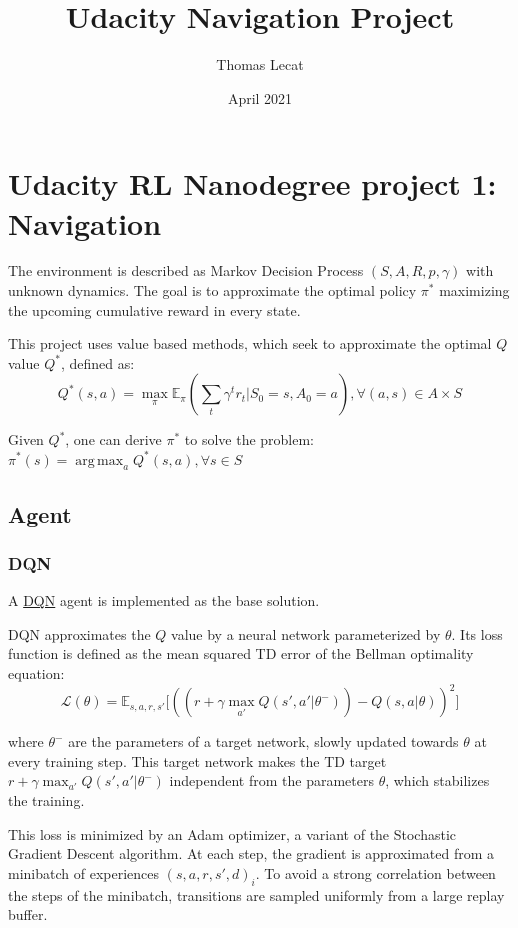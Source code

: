 \documentclass{article}
\title{Udacity Navigation Project}
\author{Thomas Lecat}
\date{April 2021}
\DeclareMathOperator*{\argmax}{arg\,max}
\begin{document}
    \maketitle


    \section{Udacity RL Nanodegree project 1: Navigation}

    The environment is described as Markov Decision Process $(S, A, R, p, \gamma)$ with
    unknown dynamics. The goal is to approximate the optimal policy $\pi^*$ maximizing
    the upcoming cumulative reward in every state.

    This project uses value based methods, which seek to approximate the optimal $Q$ value
    $Q^*$, defined as:
    \[
    Q^*(s, a) = \max_{\pi} \mathbb{E}_{\pi} (\sum_{t} \gamma^t r_t | S_0=s, A_0=a),  \forall (a, s) \in A \times S
    \]

    Given $Q^*$, one can derive $\pi^*$ to solve the problem:
    $\pi^*(s) = \argmax_a Q^*(s, a), \forall s \in S$

    \subsection{Agent}

    \subsubsection{DQN}


    A \href{https://storage.googleapis.com/deepmind-media/dqn/DQNNaturePaper.pdf}{DQN} agent
    is implemented as the base solution.

    DQN approximates the $Q$ value by a neural network parameterized by $\theta$.
    Its loss function is defined as the mean squared TD error of the Bellman optimality equation:
    \[
    \mathcal{L}(\theta) = \mathbb{E}_{s, a, r, s'} \big[((r + \gamma \max_{a'} Q(s', a' | \theta^-)) - Q(s, a | \theta))^2\big]
    \]

    where $\theta^-$ are the parameters of a target network, slowly updated towards $\theta$
    at every training step. This target network makes the TD target
    $r + \gamma \max_{a'} Q(s', a' | \theta^-)$ independent from the parameters $\theta$,
    which stabilizes the training.


    This loss is minimized by an Adam optimizer, a variant of the Stochastic Gradient
    Descent algorithm.
    At each step, the gradient is approximated from a minibatch of experiences
    ${(s, a, r, s', d)_i}$. To avoid a strong correlation between the steps of the
    minibatch, transitions are sampled uniformly from a large replay buffer.
\end{document}
